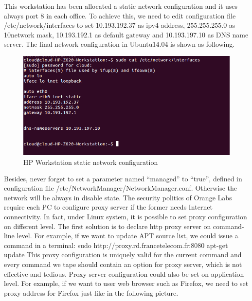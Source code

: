 This workstation has been allocated a static network configuration and it uses always port 8 in each office. To achieve
this, we need to edit configuration file /etc/network/interfaces to set 10.193.192.37 as ipv4 address, 255.255.255.0 as
10network mask, 10.193.192.1 as default gateway and 10.193.197.10 as DNS name server. The final network configuration in 
Ubuntu14.04 is shown as following.

\begin{figure}[htbp]
	\centering
		\includegraphics[scale = 0.8]{Figures/Figure5.png}
	\caption[HP Workstation static network configuration]{HP Workstation static network configuration}
	\label{fig:HP Workstation static network configuration}
\end{figure}

Besides, never forget to set a parameter named “managed” to “true”, defined in configuration file /etc/NetworkManager/NetworkManager.conf. 
Otherwise the network will be always in disable state. The security politics of Orange Labs require each PC to configure proxy server if the former needs Internet connectivity.
In fact, under Linux system, it is possible to set proxy configuration on different level. The first solution is to declare http proxy server on command-line level. 
For example, if we want to update APT source list, we could issue a command in a terminal:
sudo http://proxy.rd.francetelecom.fr:8080 apt-get update
This proxy configuration is uniquely valid for the current command and every command we tape should contain an option for proxy server, which is not effective and tedious.
Proxy server configuration could also be set on application level. For example, if we want to user web browser such as Firefox, 
we need to set proxy address for Firefox just like in the following picture.

